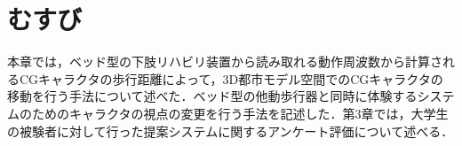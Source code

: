 \section{むすび}

本章では，ベッド型の下肢リハビリ装置から読み取れる動作周波数から計算されるCGキャラクタの歩行距離によって，3D都市モデル空間でのCGキャラクタの移動を行う手法について述べた．ベッド型の他動歩行器と同時に体験するシステムのためのキャラクタの視点の変更を行う手法を記述した．第3章では，大学生の被験者に対して行った提案システムに関するアンケート評価について述べる．
\fi

